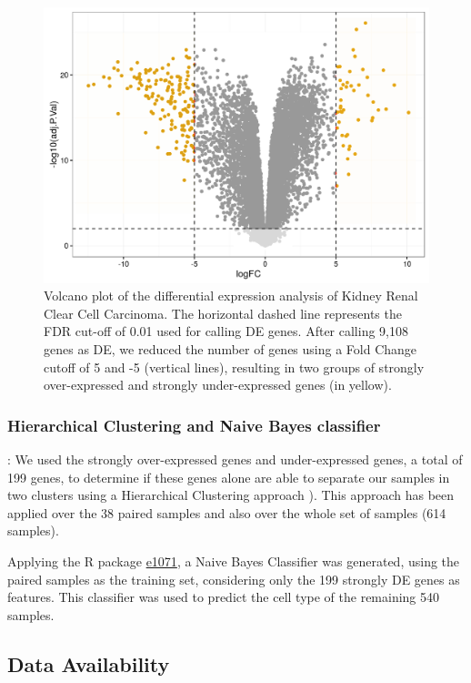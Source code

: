 \documentclass[9pt,twocolumn,twoside]{gsajnl}
\begin{document}
\begin{figure}[htbp]
\centering
\includegraphics[width=\linewidth]{figures/fig1_volcano.png}
\caption{Volcano plot of the differential expression analysis of Kidney Renal Clear Cell Carcinoma. The horizontal dashed line represents the FDR cut-off of 0.01 used for calling DE genes. After calling 9,108 genes as DE, we reduced the number of genes using a Fold Change cutoff of 5 and -5 (vertical lines), resulting in two groups of strongly over-expressed and strongly under-expressed genes (in yellow). }%
\label{fig:volcanoplot}
\end{figure}

\subsubsection*{Hierarchical Clustering and Naive Bayes classifier}
: We used the strongly over-expressed genes and under-expressed genes, a total of 199 genes, to determine if these genes alone are able to separate our samples in two clusters using a Hierarchical Clustering approach \citep{Spearman1904}). This approach has been applied over the 38 paired samples and also over the whole set of samples (614 samples).

Applying the R package \href{https://cran.r-project.org/web/packages/e1071/index.html}{e1071}, a Naive Bayes Classifier was generated, using the paired samples as the training set, considering only the 199 strongly DE genes as features. This classifier was used to predict the cell type of the remaining 540 samples. 

\subsection*{Data Availability}
\end{document}
